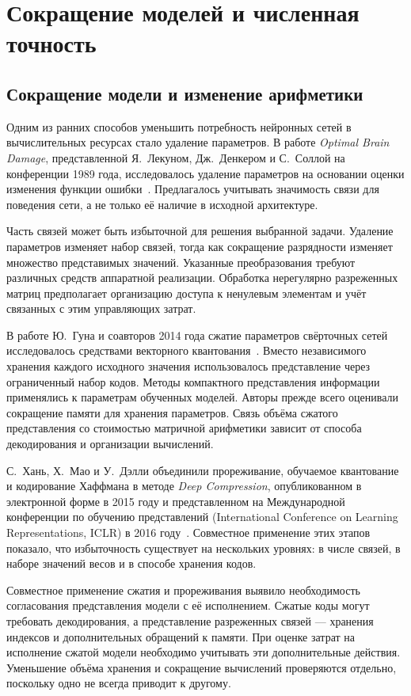 \section{Сокращение моделей и численная точность}

\subsection{Сокращение модели и изменение арифметики}

Одним из ранних способов уменьшить потребность нейронных сетей в
вычислительных ресурсах стало удаление параметров.
В работе \textit{Optimal Brain Damage},
представленной Я.~Лекуном, Дж.~Денкером и С.~Соллой на конференции
1989 года, исследовалось удаление параметров на основании оценки
изменения функции ошибки~\cite{obd1989}. Предлагалось учитывать
значимость связи для поведения сети, а не только её наличие
в исходной архитектуре.

Часть связей может быть избыточной для решения выбранной задачи.
Удаление параметров изменяет набор
связей, тогда как сокращение разрядности изменяет множество
представимых значений. Указанные преобразования требуют различных
средств аппаратной реализации. Обработка нерегулярно разреженных
матриц предполагает организацию доступа к ненулевым элементам
и учёт связанных с этим управляющих затрат.

В работе Ю.~Гуна и соавторов 2014 года сжатие параметров свёрточных
сетей исследовалось средствами векторного квантования~\cite{gong2014}.
Вместо независимого хранения каждого исходного значения использовалось
представление через ограниченный набор кодов. Методы компактного
представления информации применялись к параметрам обученных моделей.
Авторы прежде всего оценивали сокращение памяти для хранения параметров.
Связь объёма сжатого представления со стоимостью матричной арифметики
зависит от способа декодирования и организации вычислений.

С.~Хань, Х.~Мао и У.~Дэлли объединили прореживание, обучаемое
квантование и кодирование Хаффмана в методе \textit{Deep Compression},
опубликованном в электронной форме в 2015 году и представленном
на Международной конференции по обучению представлений
(International Conference on Learning Representations, ICLR)
в 2016 году~\cite{han2016}. Совместное применение этих
этапов показало, что избыточность существует на нескольких уровнях:
в числе связей, в наборе значений весов и в способе хранения кодов.

Совместное применение сжатия и прореживания выявило необходимость
согласования представления модели с её исполнением. Сжатые коды
могут требовать декодирования, а представление разреженных связей —
хранения индексов и дополнительных обращений к памяти.
При оценке затрат на исполнение сжатой модели необходимо учитывать эти
дополнительные действия. Уменьшение объёма хранения и сокращение вычислений
проверяются отдельно, поскольку одно не всегда приводит к другому.


